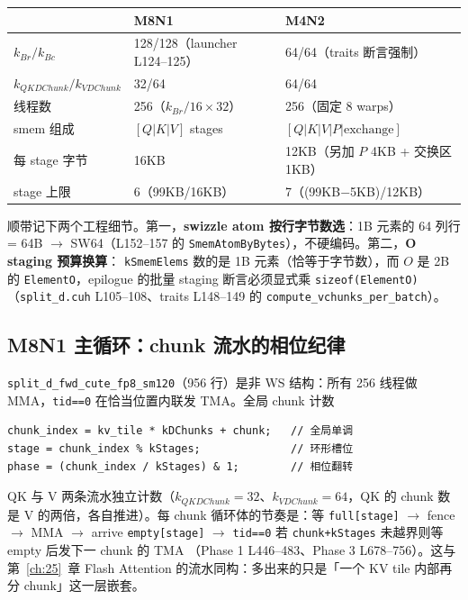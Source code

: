 \begin{center}
\begin{tabular}{@{}lll@{}}
\toprule
 & M8N1 & M4N2 \\
\midrule
$k_{Br}/k_{Bc}$ & 128/128（launcher L124--125） & 64/64（traits 断言强制） \\
$k_{QKDChunk}/k_{VDChunk}$ & 32/64 & 64/64 \\
线程数 & 256（$k_{Br}/16\times32$） & 256（固定 8 warps） \\
smem 组成 & $[Q|K|V]$ stages & $[Q|K|V|P|\text{exchange}]$ \\
每 stage 字节 & 16KB & 12KB（另加 $P$ 4KB + 交换区 1KB） \\
stage 上限 & 6（99KB/16KB） & 7（(99KB$-$5KB)/12KB） \\
\bottomrule
\end{tabular}
\end{center}

顺带记下两个工程细节。第一，\textbf{swizzle atom 按行字节数选}：1B
元素的 64 列行 = 64B $\to$ SW64（L152--157 的
\texttt{SmemAtomByBytes}），不硬编码。第二，\textbf{O staging 预算换算}：
\texttt{kSmemElems} 数的是 1B 元素（恰等于字节数），而 $O$ 是 2B 的
\texttt{ElementO}，epilogue 的批量 staging 断言必须显式乘
\texttt{sizeof(ElementO)}（\texttt{split\_d.cuh} L105--108、traits
L148--149 的 \texttt{compute\_vchunks\_per\_batch}）。

\subsection{M8N1 主循环：chunk 流水的相位纪律}

\texttt{split\_d\_fwd\_cute\_fp8\_sm120}（956 行）是非 WS 结构：所有
256 线程做 MMA，\texttt{tid==0} 在恰当位置内联发 TMA。全局 chunk 计数
\begin{lstlisting}[aboveskip=4pt,belowskip=2pt]
chunk_index = kv_tile * kDChunks + chunk;   // 全局单调
stage = chunk_index % kStages;              // 环形槽位
phase = (chunk_index / kStages) & 1;        // 相位翻转
\end{lstlisting}
QK 与 V 两条流水独立计数（$k_{QKDChunk}=32$、$k_{VDChunk}=64$，QK 的 chunk
数是 V 的两倍，各自推进）。每 chunk 循环体的节奏是：等
\texttt{full[stage]} $\to$ fence $\to$ MMA $\to$ arrive
\texttt{empty[stage]} $\to$ \texttt{tid==0} 若
\texttt{chunk+kStages} 未越界则等 empty 后发下一 chunk 的 TMA
（Phase 1 L446--483、Phase 3 L678--756）。这与第~\ref{ch:25}~章
Flash Attention 的流水同构：多出来的只是「一个 KV tile 内部再分
chunk」这一层嵌套。

